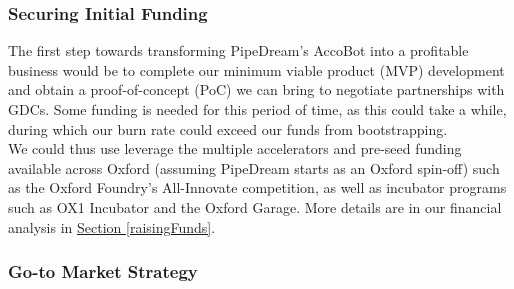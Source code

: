 \documentclass[11pt]{article}		%
\newcommand{\sectref}[1]{\hyperref[#1]{Section \ref*{#1}}}     %
\begin{document}
    	\subsubsection{Securing Initial Funding}
    	
    	The first step towards transforming PipeDream’s AccoBot into a profitable business would be to complete our minimum viable product (MVP) development and obtain a proof-of-concept (PoC) we can bring to negotiate partnerships with GDCs. Some funding is needed for this period of time, as this could take a while, during which our burn rate could exceed our funds from bootstrapping.
    	\\ 
	    \hspace*{3ex}We could thus use leverage the multiple accelerators and pre-seed funding available across Oxford (assuming PipeDream starts as an Oxford spin-off) such as the Oxford Foundry’s All-Innovate competition, as well as incubator programs such as OX1 Incubator and the Oxford Garage. More details are in our financial analysis in \sectref{raisingFunds}. 
    
    	\subsubsection{Go-to Market Strategy}
    	
\end{document}
